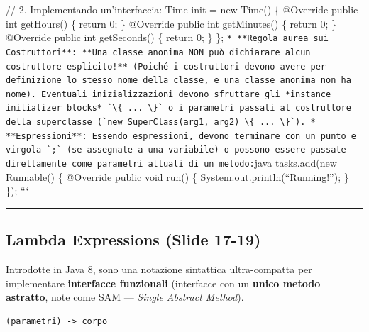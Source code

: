 \documentclass[11pt,a4paper,oneside]{report}
\newcommand{\passthrough}[1]{#1}
\begin{document}
// 2. Implementando un'interfaccia: Time init = new Time() \{ @Override
public int getHours() \{ return 0; \} @Override public int getMinutes()
\{ return 0; \} @Override public int getSeconds() \{ return 0; \} \};
\passthrough{\lstinline"* **Regola aurea sui Costruttori**: **Una classe anonima NON può dichiarare alcun costruttore esplicito!** (Poiché i costruttori devono avere per definizione lo stesso nome della classe, e una classe anonima non ha nome). Eventuali inizializzazioni devono sfruttare gli *instance initializer blocks* `\{ ... \}` o i parametri passati al costruttore della superclasse (`new SuperClass(arg1, arg2) \{ ... \}`). * **Espressioni**: Essendo espressioni, devono terminare con un punto e virgola `;` (se assegnate a una variabile) o possono essere passate direttamente come parametri attuali di un metodo:"}java
tasks.add(new Runnable() \{ @Override public void run() \{
System.out.println(``Running!''); \} \}); ```

\begin{center}\rule{0.5\linewidth}{0.5pt}\end{center}

\subsection{Lambda Expressions (Slide
17-19)}\label{chap13_lambda-expressions-slide-17-19}

Introdotte in Java 8, sono una notazione sintattica ultra-compatta per
implementare \textbf{interfacce funzionali} (interfacce con un
\textbf{unico metodo astratto}, note come SAM --- \emph{Single Abstract
Method}).

\begin{lstlisting}
(parametri) -> corpo
\end{lstlisting}
\end{document}
